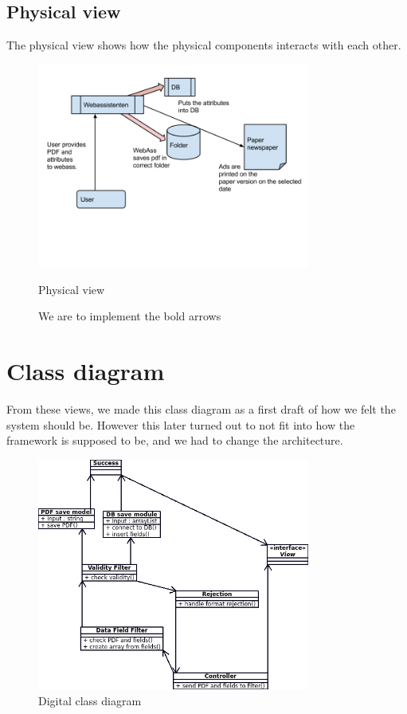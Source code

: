 \subsection{Physical view}
The physical view shows how the physical components interacts with each other.
\begin{figure}[H]
\centering
\includegraphics[width=0.8\textwidth]{images/architecture02.png}
\caption{Physical view}
\caption*{We are to implement the bold arrows}
\label{fig:physical_view}
\end{figure}
\newpage
\section{Class diagram}
From these views, we made this class diagram as a first draft of how we felt the system should be. However this later turned out to not fit into how the framework is supposed to be, and we had to change the architecture.
\begin{figure}[H]
\centering
\includegraphics[width=0.8\textwidth]{diagrams/class_diagram.png}
\caption{Digital class diagram}
\label{fig:class_diagram}
\end{figure}
